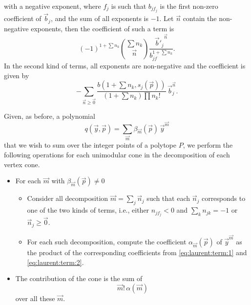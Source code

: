 with a negative exponent, where $f_j$ is such that $b_{jf_j}$ is the first
non-zero coefficient of $\vec b_j$, and the sum of all exponents is $-1$.
Let $\vec n$ contain the non-negative exponents, then the coefficient
of such a term is
\begin{equation}
\label{eq:laurent:term:1}
		(-1)^{1+\sum n_k}
	{\sum n_k \choose \vec n}
		    \frac{{\vec b'_j}^{\vec n}}{b_{jf}^{1+\sum n_k}}
.
\end{equation}
In the second kind of terms, all exponents are non-negative and
the coefficient is given by
\begin{equation}
\label{eq:laurent:term:2}
    - \sum_{\vec n \ge \vec 0}
	    \frac{b(1+\sum n_k,s_j(\vec p))}{(1+\sum n_k)\prod n_k!} \,
		\vec b_j^{\vec n}
.
\end{equation}

Given, as before, a polynomial
$$
q(\vec y, \vec p) = \sum_{\vec m} \beta_{\vec m}(\vec p) \, \vec y^{\vec m}
$$
that we wish to sum over the integer points of a polytope $P$, we perform
the following operations for each unimodular cone in the decomposition
of each vertex cone.
\begin{itemize}
\item For each $\vec m$ with $\beta_{\vec m}(\vec p) \ne 0$
\begin{itemize}
\item Consider all decomposition $\vec m = \sum_j {\vec n_j}$
such that each $\vec n_j$ corresponds to one of the two kinds of terms,
i.e., either $n_{jf_j} < 0$ and $\sum_k n_{jk} = -1$ or $\vec n_j \ge \vec 0$.
\item For each such decomposition, compute the coefficient
$\alpha_{\vec m}(\vec p)$ of
$\vec y^{\vec m}$ as the product of the corresponding
coefficients from \eqref{eq:laurent:term:1}
and \eqref{eq:laurent:term:2}.
\end{itemize}
\item The contribution of the cone is the sum of
$$
\vec m! \, \alpha(\vec m)
$$
over all these $\vec m$.
\end{itemize}

